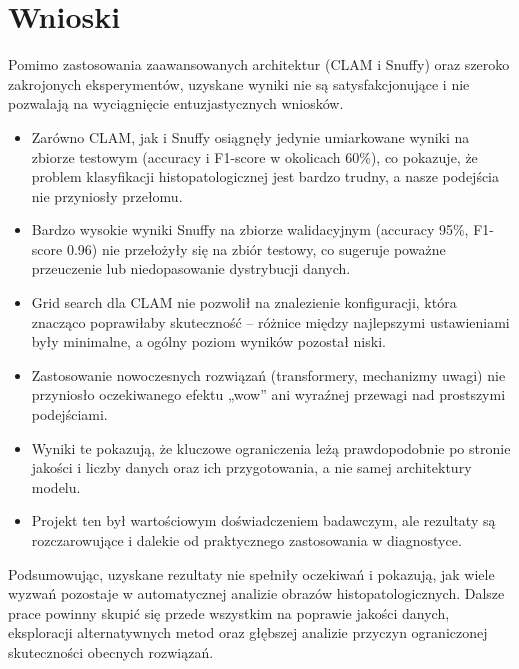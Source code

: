 \documentclass{article}
\begin{document}
\section{Wnioski}

Pomimo zastosowania zaawansowanych architektur (CLAM i Snuffy) oraz szeroko zakrojonych eksperymentów, uzyskane wyniki nie są satysfakcjonujące i nie pozwalają na wyciągnięcie entuzjastycznych wniosków.

\begin{itemize}
    \item Zarówno CLAM, jak i Snuffy osiągnęły jedynie umiarkowane wyniki na zbiorze testowym (accuracy i F1-score w okolicach 60\%), co pokazuje, że problem klasyfikacji histopatologicznej jest bardzo trudny, a nasze podejścia nie przyniosły przełomu.
    \item Bardzo wysokie wyniki Snuffy na zbiorze walidacyjnym (accuracy 95\%, F1-score 0.96) nie przełożyły się na zbiór testowy, co sugeruje poważne przeuczenie lub niedopasowanie dystrybucji danych.
    \item Grid search dla CLAM nie pozwolił na znalezienie konfiguracji, która znacząco poprawiłaby skuteczność – różnice między najlepszymi ustawieniami były minimalne, a ogólny poziom wyników pozostał niski.
    \item Zastosowanie nowoczesnych rozwiązań (transformery, mechanizmy uwagi) nie przyniosło oczekiwanego efektu „wow” ani wyraźnej przewagi nad prostszymi podejściami.
    \item Wyniki te pokazują, że kluczowe ograniczenia leżą prawdopodobnie po stronie jakości i liczby danych oraz ich przygotowania, a nie samej architektury modelu.
    \item Projekt ten był wartościowym doświadczeniem badawczym, ale rezultaty są rozczarowujące i dalekie od praktycznego zastosowania w diagnostyce.
\end{itemize}

Podsumowując, uzyskane rezultaty nie spełniły oczekiwań i pokazują, jak wiele wyzwań pozostaje w automatycznej analizie obrazów histopatologicznych. Dalsze prace powinny skupić się przede wszystkim na poprawie jakości danych, eksploracji alternatywnych metod oraz głębszej analizie przyczyn ograniczonej skuteczności obecnych rozwiązań.
\end{document}
